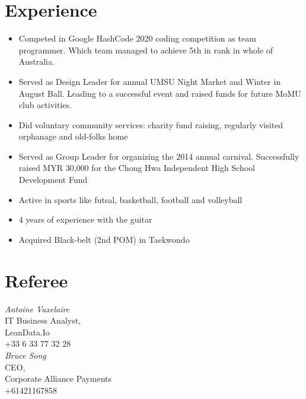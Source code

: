 \documentclass[10pt, a4paper]{cv}
\begin{document}
\begin{paracol}{2}
\begin{flushleft}
		\switchcolumn

		\section*{Experience}
		\begin{itemize} \itemsep -2pt
			\item Competed in Google HashCode 2020 coding competition as team programmer. Which team managed to achieve 5th in rank in whole of Australia.
			\item Served as Design Leader for annual UMSU Night Market and Winter in August Ball. Leading to a successful event and raised funds for future MoMU club activities.
			\item Did voluntary community services: charity fund raising, regularly visited orphanage and old-folks home
			\item Served as Group Leader for organizing the 2014 annual carnival. Successfully raised MYR 30,000 for the Chong Hwa Independent High School Development Fund
			\item Active in sports like futsal, basketball, football and volleyball
			\item  4 years of experience with the guitar
			\item Acquired Black-belt (2nd POM) in Taekwondo
		\end{itemize}

		\switchcolumn

		\section*{Referee}
		 {\sl Antoine Vaxelaire} \\
		IT Business Analyst, \\
		LeanData.Io  \\
		+33 6 33 77 32 28 \\
		\bigskip
		{\sl Bruce Song} \\
		CEO, \\
		Corporate Alliance Payments  \\
		+61421167858 \\
	\end{flushleft}
\end{paracol}
\end{document}
